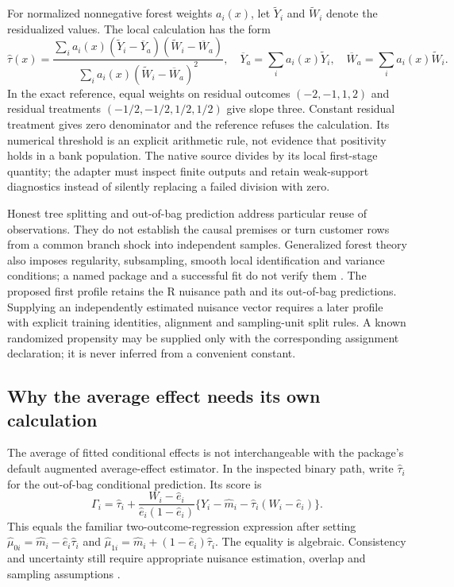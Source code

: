 For normalized nonnegative forest weights \(a_i(x)\), let
\(\widetilde Y_i\) and \(\widetilde W_i\) denote the residualized
values. The local calculation has the form \[
 \widehat\tau(x)=
 \frac{\sum_i a_i(x)(\widetilde Y_i-\overline Y_a)
                         (\widetilde W_i-\overline W_a)}
      {\sum_i a_i(x)(\widetilde W_i-\overline W_a)^2},
 \quad
 \overline Y_a=\sum_i a_i(x)\widetilde Y_i,
 \quad \overline W_a=\sum_i a_i(x)\widetilde W_i.
\] In the exact reference, equal weights on residual outcomes
\((-2,-1,1,2)\) and residual treatments \((-1/2,-1/2,1/2,1/2)\) give
slope three. Constant residual treatment gives zero denominator and the
reference refuses the calculation. Its numerical threshold is an
explicit arithmetic rule, not evidence that positivity holds in a bank
population. The native source divides by its local first-stage quantity;
the adapter must inspect finite outputs and retain weak-support
diagnostics instead of silently replacing a failed division with zero.

Honest tree splitting and out-of-bag prediction address particular reuse
of observations. They do not establish the causal premises or turn
customer rows from a common branch shock into independent samples.
Generalized forest theory also imposes regularity, subsampling, smooth
local identification and variance conditions; a named package and a
successful fit do not verify them \cite{grf2018}. The proposed first
profile retains the R nuisance path and its out-of-bag predictions.
Supplying an independently estimated nuisance vector requires a later
profile with explicit training identities, alignment and sampling-unit
split rules. A known randomized propensity may be supplied only with the
corresponding assignment declaration; it is never inferred from a
convenient constant.

\subsection{Why the average effect needs its own calculation}

The average of fitted conditional effects is not interchangeable with
the package's default augmented average-effect estimator. In the
inspected binary path, write \(\widehat\tau_i\) for the out-of-bag
conditional prediction. Its score is \[
 \Gamma_i=\widehat\tau_i+
 \frac{W_i-\widehat e_i}{\widehat e_i(1-\widehat e_i)}
 \{Y_i-\widehat m_i-\widehat\tau_i(W_i-\widehat e_i)\}.
\] This equals the familiar two-outcome-regression expression after
setting \(\widehat\mu_{0i}=\widehat m_i-\widehat e_i\widehat\tau_i\) and
\(\widehat\mu_{1i}=\widehat m_i+(1-\widehat e_i)\widehat\tau_i\). The
equality is algebraic. Consistency and uncertainty still require
appropriate nuisance estimation, overlap and sampling assumptions
\cite{exec13_grf_rpath}.

